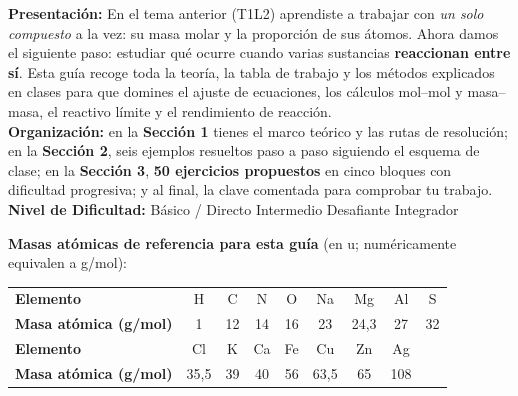 \documentclass[12pt, letterpaper]{article}
\begin{document}


\vspace{4pt}
\begin{cuadroinfo}
  \small
  \textbf{Presentación:} En el tema anterior (T1L2) aprendiste a trabajar con \emph{un solo compuesto} a la vez: su masa molar y la proporción de sus átomos. Ahora damos el siguiente paso: estudiar qué ocurre cuando varias sustancias \textbf{reaccionan entre sí}. Esta guía recoge toda la teoría, la tabla de trabajo y los métodos explicados en clases para que domines el ajuste de ecuaciones, los cálculos mol--mol y masa--masa, el reactivo límite y el rendimiento de reacción.
  \\[4pt]
  \textbf{Organización:} en la \textbf{Sección 1} tienes el marco teórico y las rutas de resolución; en la \textbf{Sección 2}, seis ejemplos resueltos paso a paso siguiendo el esquema de clase; en la \textbf{Sección 3}, \textbf{50 ejercicios propuestos} en cinco bloques con dificultad progresiva; y al final, la clave comentada para comprobar tu trabajo.
  \\[4pt]
  \textbf{Nivel de Dificultad:}\quad
  \facil{}\hspace{0.45em}Básico / Directo \quad
  \medio{}\hspace{0.45em}Intermedio \quad
  \dificil{}\hspace{0.45em}Desafiante \quad
  \muyDificil{}\hspace{0.45em}Integrador
\end{cuadroinfo}

\vspace{4pt}
\noindent\textbf{Masas atómicas de referencia para esta guía} (en u; numéricamente equivalen a g/mol):\par\nobreak
\vspace{2pt}\nobreak
\begin{center}
  \small
  \setlength{\tabcolsep}{7pt}
  \begin{tabular}{lcccccccc}
    \toprule
    \textbf{Elemento} & H & C & N & O & Na & Mg & Al & S \\
    \textbf{Masa atómica (g/mol)} & 1 & 12 & 14 & 16 & 23 & 24,3 & 27 & 32 \\
    \midrule
    \textbf{Elemento} & Cl & K & Ca & Fe & Cu & Zn & Ag & \\
    \textbf{Masa atómica (g/mol)} & 35,5 & 39 & 40 & 56 & 63,5 & 65 & 108 & \\
    \bottomrule
  \end{tabular}
\end{center}
\end{document}
